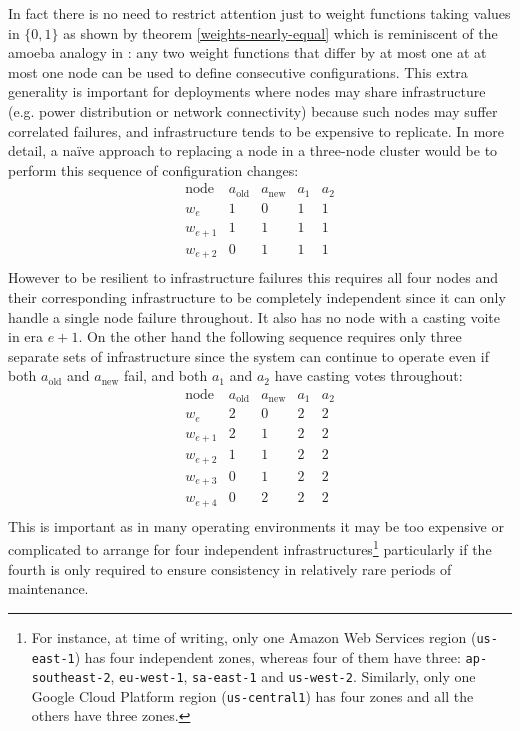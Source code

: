 \documentclass[journal]{IEEEtran}
\begin{document}
In fact there is no need to restrict attention just to weight functions taking
values in $\{0, 1\}$ as shown by theorem \ref{weights-nearly-equal} which is
reminiscent of the amoeba analogy in \cite{cheap-paxos}: any two weight
functions that differ by at most one at at most one node can be used to define
consecutive configurations. This extra generality is important for deployments
where nodes may share infrastructure (e.g. power distribution or network
connectivity) because such nodes may suffer correlated failures, and
infrastructure tends to be expensive to replicate. In more detail, a na\"ive
approach to replacing a node in a three-node cluster would be to perform this
sequence of configuration changes: \[\begin{array}{rcccc}
%
\textrm{node}&a_{\textrm{old}}&a_{\textrm{new}}&a_1&a_2 \\
%
w_e&1&0&1&1\\
%
w_{e+1}&1&1&1&1\\
%
w_{e+2}&0&1&1&1\\
%
\end{array}\]
%
However to be resilient to infrastructure failures this requires all four nodes
and their corresponding infrastructure to be completely independent since it
can only handle a single node failure throughout. It also has no node with a
casting voite in era $e+1$. On the other hand the following sequence requires
only three separate sets of infrastructure since the system can continue to
operate even if both $a_{\textrm{old}}$ and $a_{\textrm{new}}$ fail, and both
$a_1$ and $a_2$ have casting votes throughout: \[\begin{array}{rcccc}
%
\textrm{node}&a_{\textrm{old}}&a_{\textrm{new}}&a_1&a_2 \\
%
w_e&2&0&2&2\\
%
w_{e+1}&2&1&2&2\\
%
w_{e+2}&1&1&2&2\\
%
w_{e+3}&0&1&2&2\\
%
w_{e+4}&0&2&2&2\\
%
\end{array}\]
%
This is important as in many operating environments it may be too expensive or
complicated to arrange for four independent infrastructures\footnote{For
instance, at time of writing, only one Amazon Web Services region
(\texttt{us-east-1}) has four independent zones, whereas four of them have
three: \texttt{ap-southeast-2}, \texttt{eu-west-1}, \texttt{sa-east-1} and
\texttt{us-west-2}. Similarly, only one Google Cloud Platform region
(\texttt{us-central1}) has four zones and all the others have three zones.}
particularly if the fourth is only required to ensure consistency in relatively
rare periods of maintenance.
\end{document}
